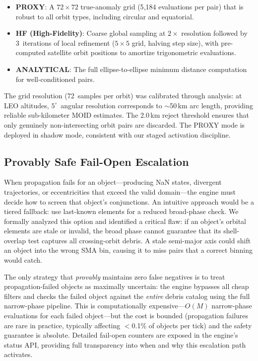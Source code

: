 \documentclass[10pt,twocolumn,letterpaper]{article}
\begin{document}
\begin{itemize}[nosep,leftmargin=*]
  \item \textbf{PROXY}: A $72 \times 72$ true-anomaly grid (5{,}184
    evaluations per pair) that is robust to all orbit types, including
    circular and equatorial.
  \item \textbf{HF (High-Fidelity)}: Coarse global sampling at
    $2\times$ resolution followed by 3~iterations of local refinement
    ($5 \times 5$ grid, halving step size), with pre-computed satellite
    orbit positions to amortize trigonometric evaluations.
  \item \textbf{ANALYTICAL}: The full ellipse-to-ellipse minimum
    distance computation for well-conditioned pairs.
\end{itemize}

The grid resolution (72~samples per orbit) was calibrated through
analysis: at LEO altitudes, $5^{\circ}$~angular resolution corresponds
to $\sim$50\,km arc length, providing reliable sub-kilometer MOID
estimates.  The 2.0\,km reject threshold ensures that only genuinely
non-intersecting orbit pairs are discarded.  The PROXY mode is deployed
in shadow mode, consistent with our staged activation discipline.

\subsection{Provably Safe Fail-Open Escalation}

When propagation fails for an object---producing NaN states, divergent
trajectories, or eccentricities that exceed the valid domain---the engine
must decide how to screen that object's conjunctions.  An intuitive
approach would be a tiered fallback: use last-known elements for a
reduced broad-phase check.  We formally analyzed this option and
identified a critical flaw: if an object's orbital elements are stale or
invalid, the broad phase cannot guarantee that its shell-overlap test
captures all crossing-orbit debris.  A stale semi-major axis could shift
an object into the wrong SMA bin, causing it to miss pairs that a correct
binning would catch.

The only strategy that \emph{provably} maintains zero false negatives is
to treat propagation-failed objects as maximally uncertain: the engine
bypasses all cheap filters and checks the failed object against the
\emph{entire} debris catalog using the full narrow-phase pipeline.  This
is computationally expensive---$O(M)$ narrow-phase evaluations for each
failed object---but the cost is bounded (propagation failures are rare in
practice, typically affecting $<$0.1\% of objects per tick) and the
safety guarantee is absolute.  Detailed fail-open counters are exposed
in the engine's status API, providing full transparency into when and why
this escalation path activates.
\end{document}
